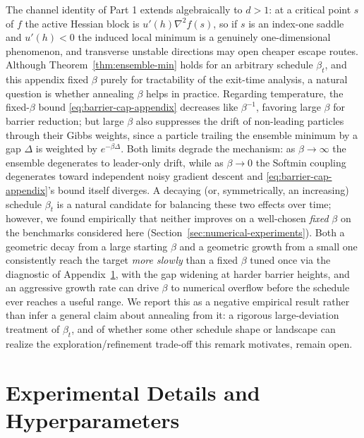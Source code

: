 \documentclass{opt2026} %
\begin{document}
\begin{remark}
\label{rem:higher-dim}
The channel identity of Part 1 extends algebraically to $d>1$: at a critical point $s$ of $f$ the active Hessian block is $u'(h)\nabla^2 f(s)$, so if $s$ is an index-one saddle and $u'(h)<0$ the induced local minimum is a genuinely one-dimensional phenomenon, and transverse unstable directions may open cheaper escape routes. Although Theorem~\ref{thm:ensemble-min} holds for an arbitrary schedule $\beta_t$, and this appendix fixed $\beta$ purely for tractability of the exit-time analysis, a natural question is whether annealing $\beta$ helps in practice. Regarding temperature, the fixed-$\beta$ bound \eqref{eq:barrier-cap-appendix} decreases like $\beta^{-1}$, favoring large $\beta$ for barrier reduction; but large $\beta$ also suppresses the drift of non-leading particles through their Gibbs weights, since a particle trailing the ensemble minimum by a gap $\Delta$ is weighted by $e^{-\beta\Delta}$. Both limits degrade the mechanism: as $\beta\to\infty$ the ensemble degenerates to leader-only drift, while as $\beta\to0$ the Softmin coupling degenerates toward independent noisy gradient descent and \eqref{eq:barrier-cap-appendix}'s bound itself diverges. A decaying (or, symmetrically, an increasing) schedule $\beta_t$ is a natural candidate for balancing these two effects over time; however, we found empirically that neither improves on a well-chosen \emph{fixed} $\beta$ on the benchmarks considered here (Section~\ref{sec:numerical-experiments}). Both a geometric decay from a large starting $\beta$ and a geometric growth from a small one consistently reach the target \emph{more slowly} than a fixed $\beta$ tuned once via the diagnostic of Appendix~\ref{app:hyperparameters}, with the gap widening at harder barrier heights, and an aggressive growth rate can drive $\beta$ to numerical overflow before the schedule ever reaches a useful range. We report this as a negative empirical result rather than infer a general claim about annealing from it: a rigorous large-deviation treatment of $\beta_t$, and of whether some other schedule shape or landscape can realize the exploration/refinement trade-off this remark motivates, remain open.
\end{remark}

\section{Experimental Details and Hyperparameters}
\label{app:hyperparameters}
\end{document}
